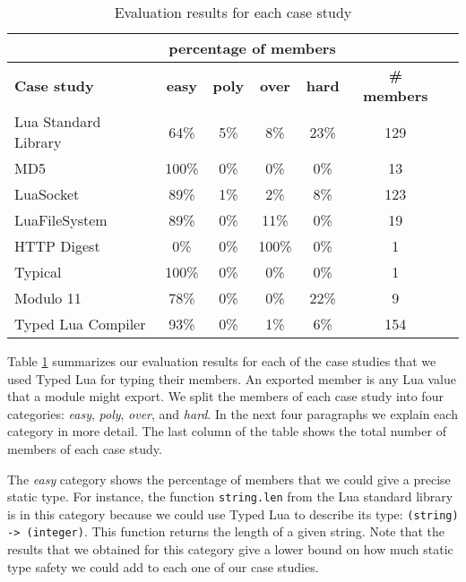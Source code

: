 \begin{table}[!ht]
\begin{center}
\begin{tabular}{|l|c|c|c|c|c|c|}
\cline{2-5}
\multicolumn{1}{c}{} & \multicolumn{4}{|c|}{percentage of members} & \multicolumn{1}{c}{} \\
\hline
\textbf{Case study} & \textbf{easy} & \textbf{poly} & \textbf{over} & \textbf{hard} & \textbf{\# members} \\
\hline
Lua Standard Library & 64\% & 5\% & 8\% & 23\% & 129 \\ %
\hline
MD5 & 100\% & 0\% & 0\% & 0\% & 13 \\ %
\hline
LuaSocket & 89\% & 1\% & 2\% & 8\% & 123 \\ %
\hline
LuaFileSystem & 89\% & 0\% & 11\% & 0\% & 19 \\ %
\hline
HTTP Digest & 0\% & 0\% & 100\% & 0\% & 1 \\ %
\hline
Typical & 100\% & 0\% & 0\% & 0\% & 1 \\ %
\hline
Modulo 11 & 78\% & 0\% & 0\% & 22\% & 9 \\ %
\hline
Typed Lua Compiler & 93\% & 0\% & 1\% & 6\% & 154 \\ %
\hline
\end{tabular}
\end{center}
\caption{Evaluation results for each case study}
\label{tab:evalbycase}
\end{table}

Table \ref{tab:evalbycase} summarizes our evaluation results for each
of the case studies that we used Typed Lua for typing their members.
An exported member is any Lua value that a module might export.
We split the members of each case study into four categories:
\emph{easy}, \emph{poly}, \emph{over}, and \emph{hard}.
In the next four paragraphs we explain each category in more detail.
The last column of the table shows the total number of members
of each case study.

The \emph{easy} category shows the percentage of members that
we could give a precise static type.
For instance, the function \texttt{string.len} from the Lua
standard library is in this category because we could use
Typed Lua to describe its type: \texttt{(string) -> (integer)}.
This function returns the length of a given string.
Note that the results that we obtained for this category give
a lower bound on how much static type safety
we could add to each one of our case studies.

